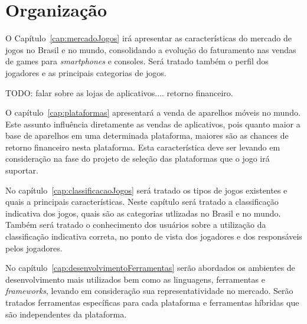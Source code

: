 
\section{Organização}


O Capítulo~\ref{cap:mercadoJogos} irá apresentar as características do mercado de jogos no Brasil e no mundo, consolidando a evolução do faturamento nas vendas de games para \emph{smartphones} e consoles. Será tratado também o perfil dos jogadores e as principais categorias de jogos.

TODO: falar sobre as lojas de aplicativos.... retorno financeiro.




O capítulo~\ref{cap:plataformas} apresentará a venda de aparelhos móveis no mundo. Este assunto influência diretamente as vendas de aplicativos, pois quanto maior a base de aparelhos em uma determinada plataforma, maiores são as chances de retorno financeiro nesta plataforma. Esta característica deve ser levando em consideração na fase do projeto de seleção das plataformas que o jogo irá suportar.






No capítulo~\ref{cap:classificacaoJogos} será tratado os tipos de jogos existentes e quais a principais características.
Neste capítulo será tratado a classificação indicativa dos jogos, quais são as categorias utlizadas no Brasil e no mundo. Também será tratado o conhecimento dos usuários sobre a utilização da classificação indicativa correta, no ponto de vista dos jogadores e dos responsáveis pelos jogadores.



No capítulo~\ref{cap:desenvolvimentoFerramentas} serão abordados os ambientes de desenvolvimento mais utilizados bem como as linguagens, ferramentas e \emph{frameworks}, levando em consideração sua representatividade no mercado. Serão tratados ferramentas específicas para cada plataforma e ferramentas híbridas que são independentes da plataforma.


